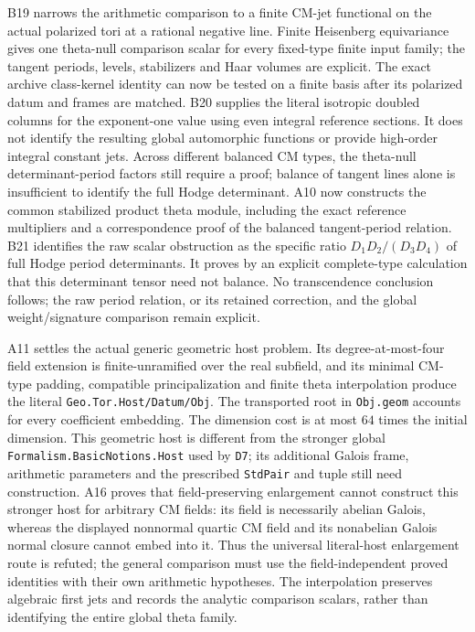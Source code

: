 B19 narrows the arithmetic comparison to a finite CM-jet
functional on the actual polarized tori at a rational negative
line. Finite Heisenberg equivariance gives one theta-null
comparison scalar for every fixed-type finite input family;
the tangent periods, levels, stabilizers and Haar volumes are
explicit. The exact archive class-kernel identity can now be
tested on a finite basis after its polarized datum and frames
are matched. B20 supplies the literal isotropic doubled columns
for the exponent-one value using even integral reference sections.
It does not identify the resulting global automorphic functions
or provide high-order integral constant jets. Across different
balanced CM types, the theta-null determinant-period factors
still require a proof; balance of tangent lines alone is
insufficient to identify the full Hodge determinant.
A10 now constructs the common stabilized product theta module,
including the exact reference multipliers and a correspondence
proof of the balanced tangent-period relation. B21 identifies
the raw scalar obstruction as the specific ratio
$D_1D_2/(D_3D_4)$ of full Hodge period determinants. It proves
by an explicit complete-type calculation that this determinant
tensor need not balance. No transcendence conclusion follows;
the raw period relation, or its retained correction, and the
global weight/signature comparison remain explicit.

A11 settles the actual generic geometric host problem. Its
degree-at-most-four field extension is finite-unramified over
the real subfield, and its minimal CM-type padding, compatible
principalization and finite theta interpolation produce the
literal \texttt{Geo.Tor.Host/Datum/Obj}. The transported root
in \texttt{Obj.geom} accounts for every coefficient embedding.
The dimension cost is at most $64$ times the initial dimension.
This geometric host is different from the stronger global
\texttt{Formalism.BasicNotions.Host} used by \texttt{D7};
its additional Galois frame, arithmetic parameters and the
prescribed \texttt{StdPair} and tuple still need construction.
A16 proves that field-preserving enlargement cannot construct this
stronger host for arbitrary CM fields: its field is necessarily
abelian Galois, whereas the displayed nonnormal quartic CM field
and its nonabelian Galois normal closure cannot embed into it.
Thus the universal literal-host enlargement route is refuted;
the general comparison must use the field-independent proved
identities with their own arithmetic hypotheses.
The interpolation preserves algebraic first jets and records
the analytic comparison scalars, rather than identifying the
entire global theta family.

